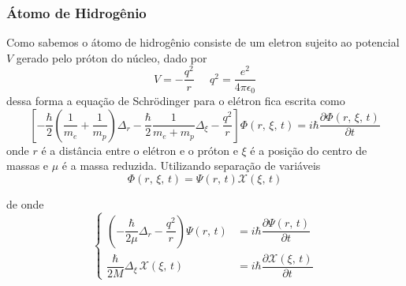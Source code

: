 \documentclass[12pt,brazil,table]{beamer}
\begin{document}
\begin{frame}
  \frametitle{Átomo de Hidrogênio}
  \fontsize{9pt}{11pt}\selectfont
  
  Como sabemos o átomo de hidrogênio consiste de um eletron sujeito ao potencial $V$ gerado pelo próton do núcleo, dado por
        \[
          V = - \dfrac{q^2}{r}\;\;\;\;\; q^2=\dfrac{e^2}{4\pi\epsilon_0}
          \nonumber
        \]
  dessa forma a equação de Schrödinger para o elétron fica escrita como
  \[
   \left[ -\dfrac{\hbar}{2} \left( \dfrac{1}{m_e}+\dfrac{1}{m_p} \right)\Delta_r-\dfrac{\hbar}{2} \dfrac{1}{m_e+m_p}\Delta_\xi -  \dfrac{q^2}{r}\right] \Phi\left(r,\,\xi,\,t \right) = i\hbar \dfrac{\partial \Phi\left(r,\,\xi,\,t \right)}{\partial t}
  \]
  onde $r$ é a distância entre o elétron e o próton e $\xi$ é a posição do centro de massas e $\mu$ é a massa reduzida. Utilizando separação de variáveis
  \[
   \Phi\left(r,\,\xi,\,t \right) = \Psi(r,\,t)\mathcal{X}(\xi,\,t)
  \]

  de onde
  \[
  \begin{cases}
   \left( -\dfrac{\hbar}{2\mu}\Delta_r - \dfrac{q^2}{r}\right)  \Psi\left(r,\,t \right) &= i\hbar \dfrac{\partial \Psi\left(r,\,t \right)}{\partial t}\\
   \dfrac{\hbar}{2M} \Delta_\xi \, \mathcal{X}\left(\xi,\,t \right) &= i\hbar  \dfrac{\partial \mathcal{X}\left(\xi,\,t \right)}{\partial t}
  \end{cases}
\]

\end{frame}


  
\end{document}
